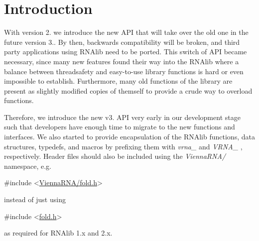 \hypertarget{newAPI_newAPI_intro}{}\section{Introduction}\label{newAPI_newAPI_intro}
With version 2. we introduce the new A\+PI that will take over the old one in the future version 3.. By then, backwards compatibility will be broken, and third party applications using R\+N\+Alib need to be ported. This switch of A\+PI became necessary, since many new features found their way into the R\+N\+Alib where a balance between threadsafety and easy-\/to-\/use library functions is hard or even impossible to establish. Furthermore, many old functions of the library are present as slightly modified copies of themself to provide a crude way to overload functions.

Therefore, we introduce the new v3. A\+PI very early in our development stage such that developers have enough time to migrate to the new functions and interfaces. We also started to provide encapsulation of the R\+N\+Alib functions, data structures, typedefs, and macros by prefixing them with {\itshape vrna\+\_\+} and {\itshape V\+R\+N\+A\+\_\+} , respectively. Header files should also be included using the {\itshape Vienna\+R\+N\+A/} namespace, e.\+g. 
\begin{DoxyCode}
\textcolor{preprocessor}{#include <\mbox{\hyperlink{fold_8h}{ViennaRNA/fold.h}}>}
\end{DoxyCode}
 instead of just using 
\begin{DoxyCode}
\textcolor{preprocessor}{#include <\mbox{\hyperlink{fold_8h}{fold.h}}>}
\end{DoxyCode}
 as required for R\+N\+Alib 1.\+x and 2.\+x.

